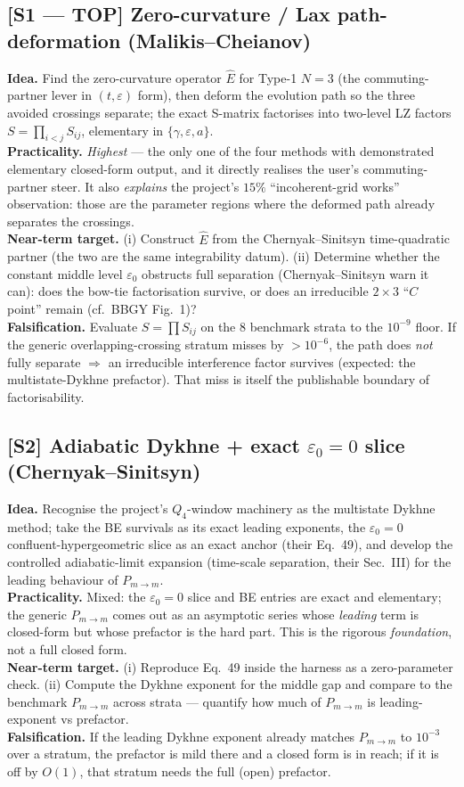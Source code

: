 \documentclass[11pt]{article}
\newcommand{\eps}{\varepsilon}
\newcommand{\Pmid}{P_{m\to m}}
\begin{document}
\subsection*{[S1 --- TOP] Zero-curvature / Lax path-deformation (Malikis--Cheianov)}
\textbf{Idea.} Find the zero-curvature operator $\hat E$ for Type-1 $N{=}3$ (the commuting-partner
lever in $(t,\eps)$ form), then deform the evolution path so the three avoided crossings separate;
the exact S-matrix factorises into two-level LZ factors $S=\prod_{i<j}S_{ij}$, elementary in
$\{\gamma,\eps,a\}$.\\
\textbf{Practicality.} \emph{Highest} --- the only one of the four methods with demonstrated
elementary closed-form output, and it directly realises the user's commuting-partner steer. It
also \emph{explains} the project's $15\%$ ``incoherent-grid works'' observation: those are the
parameter regions where the deformed path already separates the crossings.\\
\textbf{Near-term target.} (i) Construct $\hat E$ from the Chernyak--Sinitsyn time-quadratic
partner (the two are the same integrability datum). (ii) Determine whether the constant middle
level $\eps_0$ obstructs full separation (Chernyak--Sinitsyn warn it can): does the bow-tie
factorisation survive, or does an irreducible $2{\times}3$ ``$C$ point'' remain (cf.\ BBGY Fig.~1)?\\
\textbf{Falsification.} Evaluate $S=\prod S_{ij}$ on the 8 benchmark strata to the $10^{-9}$ floor.
If the generic overlapping-crossing stratum misses by $>10^{-6}$, the path does \emph{not} fully
separate $\Rightarrow$ an irreducible interference factor survives (expected: the
multistate-Dykhne prefactor). That miss is itself the publishable boundary of factorisability.

\subsection*{[S2] Adiabatic Dykhne + exact $\eps_0{=}0$ slice (Chernyak--Sinitsyn)}
\textbf{Idea.} Recognise the project's $Q_4$-window machinery as the multistate Dykhne method;
take the BE survivals as its exact leading exponents, the $\eps_0=0$ confluent-hypergeometric
slice as an exact anchor (their Eq.~49), and develop the controlled adiabatic-limit expansion
(time-scale separation, their Sec.~III) for the leading behaviour of $\Pmid$.\\
\textbf{Practicality.} Mixed: the $\eps_0=0$ slice and BE entries are exact and elementary; the
generic $\Pmid$ comes out as an asymptotic series whose \emph{leading} term is closed-form but
whose prefactor is the hard part. This is the rigorous \emph{foundation}, not a full closed form.\\
\textbf{Near-term target.} (i) Reproduce Eq.~49 inside the harness as a zero-parameter check.
(ii) Compute the Dykhne exponent for the middle gap and compare to the benchmark $\Pmid$ across
strata --- quantify how much of $\Pmid$ is leading-exponent vs prefactor.\\
\textbf{Falsification.} If the leading Dykhne exponent already matches $\Pmid$ to $10^{-3}$ over a
stratum, the prefactor is mild there and a closed form is in reach; if it is off by $O(1)$, that
stratum needs the full (open) prefactor.
\end{document}
